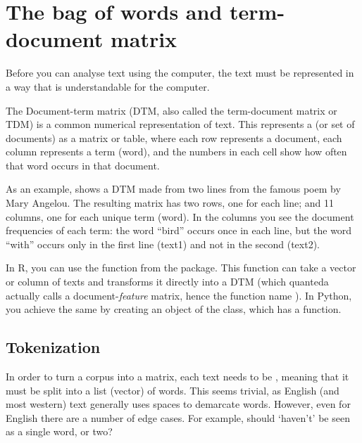 \section{The bag of words and term-document matrix}
\label{sec:dtm}

Before you can analyse text using the computer, the text must be represented in a way that is understandable for the computer.

The Document-term matrix (DTM, also called the term-document matrix or TDM) is a common numerical representation of text.
This represents a  (or set of documents) as a matrix or table, where each row represents a document, each column represents a term (word),
and the numbers in each cell show how often that word occurs in that document.


As an example,  shows a DTM made from two lines from the famous poem by Mary Angelou.
The resulting matrix has two rows, one for each line; and 11 columns, one for each unique term (word).
In the columns you see the document frequencies of each term: the word ``bird'' occurs once in each line,
but the word ``with'' occurs only in the first line (text1) and not in the second (text2).

In R, you can use the  function from the  package.
This function can take a vector or column of texts and transforms it directly into a DTM
(which quanteda actually calls a document-\emph{feature} matrix, hence the function name ).
In Python, you achieve the same by creating an object of the  class, which has a  function.


\subsection{Tokenization}

In order to turn a corpus into a matrix, each text needs to be ,
meaning that it must be split into a list (vector) of words.
This seems trivial, as English (and most western) text generally uses spaces to demarcate words.
However, even for English there are a number of edge cases. 
For example, should `haven't' be seen as a single word, or two?



